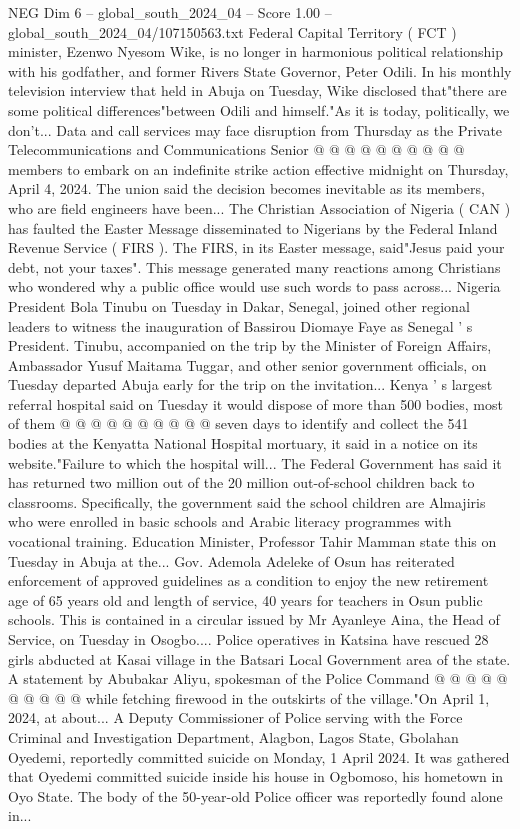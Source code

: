 \begin{textsample}{NEG Dim 6 – global\_south\_2024\_04 – Score 1.00 – global\_south\_2024\_04/107150563.txt}
Federal Capital Territory ( FCT ) minister, Ezenwo Nyesom Wike, is no longer in harmonious political relationship with his godfather, and former Rivers State Governor, Peter Odili.
In his monthly television interview that held in Abuja on Tuesday, Wike disclosed that"there are some political differences"between Odili and himself."As it is today, politically, we don't...
Data and call services may face disruption from Thursday as the Private Telecommunications and Communications Senior @ @ @ @ @ @ @ @ @ @ members to embark on an indefinite strike action effective midnight on Thursday, April 4, 2024.
The union said the decision becomes inevitable as its members, who are field engineers have been...
The Christian Association of Nigeria ( CAN ) has faulted the Easter Message disseminated to Nigerians by the Federal Inland Revenue Service ( FIRS ).
The FIRS, in its Easter message, said"Jesus paid your debt, not your taxes".
This message generated many reactions among Christians who wondered why a public office would use such words to pass across...
Nigeria President Bola Tinubu on Tuesday in Dakar, Senegal, joined other regional leaders to witness the inauguration of Bassirou Diomaye Faye as Senegal ' s President.
Tinubu, accompanied on the trip by the Minister of Foreign Affairs, Ambassador Yusuf Maitama Tuggar, and other senior government officials, on Tuesday departed Abuja early for the trip on the invitation...
Kenya ' s largest referral hospital said on Tuesday it would dispose of more than 500 bodies, most of them @ @ @ @ @ @ @ @ @ @ seven days to identify and collect the 541 bodies at the Kenyatta National Hospital mortuary, it said in a notice on its website."Failure to which the hospital will...
The Federal Government has said it has returned two million out of the 20 million out-of-school children back to classrooms.
Specifically, the government said the school children are Almajiris who were enrolled in basic schools and Arabic literacy programmes with vocational training.
Education Minister, Professor Tahir Mamman state this on Tuesday in Abuja at the...
Gov.
Ademola Adeleke of Osun has reiterated enforcement of approved guidelines as a condition to enjoy the new retirement age of 65 years old and length of service, 40 years for teachers in Osun public schools.
This is contained in a circular issued by Mr Ayanleye Aina, the Head of Service, on Tuesday in Osogbo....
Police operatives in Katsina have rescued 28 girls abducted at Kasai village in the Batsari Local Government area of the state.
A statement by Abubakar Aliyu, spokesman of the Police Command @ @ @ @ @ @ @ @ @ @ while fetching firewood in the outskirts of the village."On April 1, 2024, at about...
A Deputy Commissioner of Police serving with the Force Criminal and Investigation Department, Alagbon, Lagos State, Gbolahan Oyedemi, reportedly committed suicide on Monday, 1 April 2024.
It was gathered that Oyedemi committed suicide inside his house in Ogbomoso, his hometown in Oyo State.
The body of the 50-year-old Police officer was reportedly found alone in...

\end{textsample}
